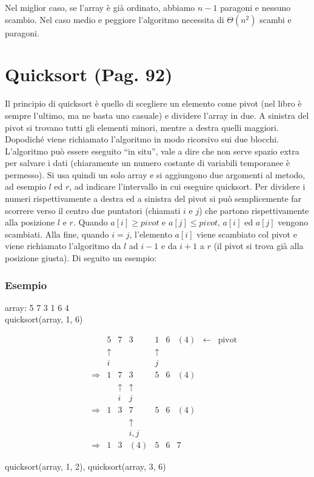 \documentclass[a4paper]{book}
\begin{document}
Nel miglior caso, se l'array è già ordinato, abbiamo $n-1$ paragoni e nessuno scambio. Nel caso medio e peggiore l'algoritmo necessita di $\Theta (n^2)$ scambi e paragoni.

\section{Quicksort (Pag. 92)}
Il principio di quicksort è quello di scegliere un elemento come pivot (nel libro è sempre l'ultimo, ma ne basta uno casuale) e dividere l'array in due. A sinistra del pivot si trovano tutti gli elementi minori, mentre a destra quelli maggiori. Dopodiché viene richiamato l'algoritmo in modo ricorsivo sui due blocchi. L'algoritmo può essere eseguito ``in situ'', vale a dire che non serve spazio extra per salvare i dati (chiaramente un numero costante di variabili temporanee è permesso). Si usa quindi un solo array e si aggiungono due argomenti al metodo, ad esempio $l$ ed $r$, ad indicare l'intervallo in cui eseguire quicksort. Per dividere i numeri rispettivamente a destra ed a sinistra del pivot si può semplicemente far scorrere verso il centro due puntatori (chiamati $i$ e $j$) che partono rispettivamente alla posizione $l$ e $r$. Quando $a[i] \geq pivot$ e $a[j] \leq pivot$, $a[i]$ ed $a[j]$ vengono scambiati. Alla fine, quando $i=j$, l'elemento $a[i]$ viene scambiato col pivot e viene richiamato l'algoritmo da $l$ ad $i-1$ e da $i+1$ a $r$ (il pivot si trova già alla posizione giusta). Di seguito un esempio:
\subsubsection*{Esempio}
\begin{center}
array: 5 7 3 1 6 4\\
quicksort(array, 1, 6)
\end{center}
\[\begin{array}{*{20}{c}}
{}&{}&{}&5&7&3&1&6&{(4)}& \leftarrow &{{\text{pivot}}}\\
{}&{}&{}& \uparrow &{}&{}& \uparrow &{}&{}&{}&{}\\
{}&{}&{}&i&{}&{}&j&{}&{}&{}&{}\\
{}&{}& \Rightarrow &1&7&3&5&6&{(4)}&{}&{}\\
{}&{}&{}&{}& \uparrow & \uparrow &{}&{}&{}&{}&{}\\
{}&{}&{}&{}&i&j&{}&{}&{}&{}&{}\\
{}&{}& \Rightarrow &1&3&7&5&6&{(4)}&{}&{}\\
{}&{}&{}&{}&{}& \uparrow &{}&{}&{}&{}&{}\\
{}&{}&{}&{}&{}&{i,j}&{}&{}&{}&{}&{}\\
{}&{}& \Rightarrow &1&3&{(4)}&5&6&7&{}&{}
\end{array}\]
\begin{center}quicksort(array, 1, 2), quicksort(array, 3, 6)\end{center}
\end{document}
